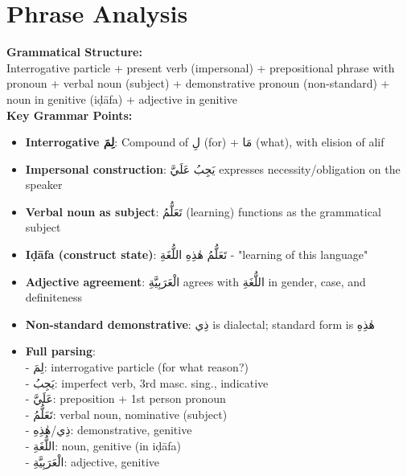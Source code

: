 \documentclass[letterpaper,12pt]{article}
\begin{document}
\section{Phrase Analysis}
\begin{tcolorbox}[colback=boxcolor,colframe=headercolor,breakable]
\textbf{Grammatical Structure:}\\
Interrogative particle + present verb (impersonal) + prepositional phrase with pronoun + verbal noun (subject) + demonstrative pronoun (non-standard) + noun in genitive (iḍāfa) + adjective in genitive \\[0.5em]

\textbf{Key Grammar Points:}
\begin{itemize}
\item \textbf{Interrogative \textarabic{لِمَ}}: Compound of \textarabic{لِ} (for) + \textarabic{مَا} (what), with elision of alif
\item \textbf{Impersonal construction}: \textarabic{يَجِبُ عَلَيَّ} expresses necessity/obligation on the speaker
\item \textbf{Verbal noun as subject}: \textarabic{تَعَلُّمُ} (learning) functions as the grammatical subject
\item \textbf{Iḍāfa (construct state)}: \textarabic{تَعَلُّمُ هٰذِهِ اللُّغَةِ} - "learning of this language"
\item \textbf{Adjective agreement}: \textarabic{الْعَرَبِيَّةِ} agrees with \textarabic{اللُّغَةِ} in gender, case, and definiteness
\item \textbf{Non-standard demonstrative}: \textarabic{ذِي} is dialectal; standard form is \textarabic{هٰذِهِ}
\item \textbf{Full parsing}: \\
  - \textarabic{لِمَ}: interrogative particle (for what reason?)\\
  - \textarabic{يَجِبُ}: imperfect verb, 3rd masc. sing., indicative\\
  - \textarabic{عَلَيَّ}: preposition + 1st person pronoun\\
  - \textarabic{تَعَلُّمُ}: verbal noun, nominative (subject)\\
  - \textarabic{ذِي/هٰذِهِ}: demonstrative, genitive\\
  - \textarabic{اللُّغَةِ}: noun, genitive (in iḍāfa)\\
  - \textarabic{الْعَرَبِيَّةِ}: adjective, genitive
\end{itemize}
\end{tcolorbox}
\end{document}
